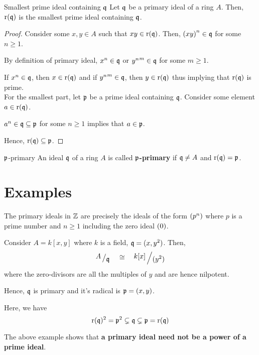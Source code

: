 \begin{proposition}{Smallest prime ideal containing \(\mathfrak{q}\)}{}
\label{prop:4_1}
	Let \(\mathfrak{q}\) be a primary ideal of a ring \(A\).
	Then, \(\operatorname{r}(\mathfrak{q})\) is the smallest prime ideal containing \(\mathfrak{q}\).
\end{proposition}
\begin{proof}
	Consider some \(x, y \in A\) such that \(xy \in \operatorname{r}(\mathfrak{q})\).
	Then, \(\left( xy \right)^n \in \mathfrak{q}\) for some \(n \geq 1\).

	By definition of primary ideal, \(x^n \in \mathfrak{q}\) or \({y^n}^m \in \mathfrak{q}\)
	for some \(m \geq 1\).

	If \(x^n \in \mathfrak{q}\), then \(x \in \operatorname{r}(\mathfrak{q})\) and if \({y^n}^m \in \mathfrak{q}\),
	then \(y \in \operatorname{r}(\mathfrak{q})\) thus implying that \(\operatorname{r}(\mathfrak{q})\) is prime. \\

	For the smallest part, let \(\mathfrak{p}\) be a prime ideal containing \(\mathfrak{q}\).
	Consider some element \(a \in \operatorname{r}(\mathfrak{q})\).

	\(a^n \in \mathfrak{q} \subseteq \mathfrak{p}\) for some \(n \geq 1\) implies that
	\(a \in \mathfrak{p}\).

	Hence, \(\operatorname{r}(\mathfrak{q}) \subseteq \mathfrak{p}\).
\end{proof}

\begin{defn}{\(\mathfrak{p}\)-primary}{}
	An ideal \(\mathfrak{q}\) of a ring \(A\) is called \textbf{\(\mathfrak{p}\)-primary}
	if \(\mathfrak{q} \neq A\) and \(\operatorname{r}(\mathfrak{q}) = \mathfrak{p}\).
\end{defn}


\section{Examples}

The primary ideals in \(\ZZ\) are precisely the ideals of the form
\(\left( p^n \right)\) where \(p\) is a prime number and \(n \geq 1\) including
the zero ideal \(\left( 0 \right)\).

\begin{example}{}{}
	Consider \(A = k[x, y]\) where \(k\) is a field, \(\mathfrak{q} = (x, y^2)\).
	Then,
	\[
		\bigslant{A}{\mfq} \quad \cong \quad \bigslant{k[x]}{(y^2)}
	\]
	where the zero-divisors are all the multiples of \(y\) and are
	hence nilpotent.

	Hence, \(\mathfrak{q}\) is primary and it's radical is \(\mathfrak{p} = (x, y)\).

	Here, we have
	\[
		\operatorname{r}(\mathfrak{q})^2 = \mathfrak{p}^2 \subsetneq \mathfrak{q} \subsetneq \mathfrak{p} = \operatorname{r}(\mathfrak{q})
	\]
\end{example}
The above example shows that \textbf{a primary ideal
need not be a power of a prime ideal}.

